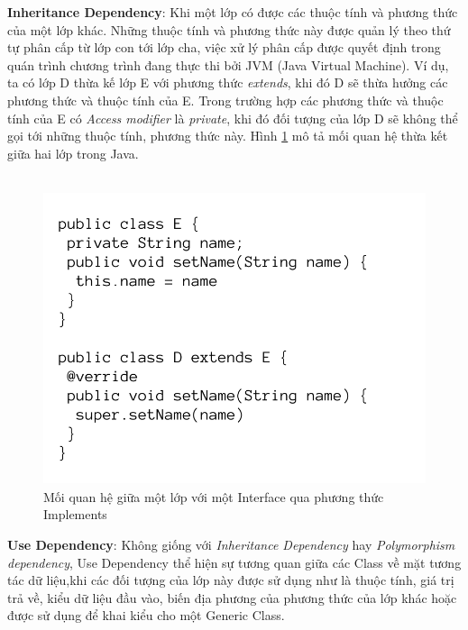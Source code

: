 \documentclass[12pt]{report}
\begin{document}
\newpage
\noindent \textbf{Inheritance Dependency}: Khi một lớp có được các thuộc tính và phương thức của một lớp khác. Những thuộc tính và phương thức này được quản lý theo thứ tự phân cấp từ lớp con tới lớp cha, việc xử lý phân cấp được quyết định trong quán trình chương trình đang thực thi bởi JVM (Java Virtual Machine). Ví dụ, ta có lớp D thừa kế lớp E với phương thức \textit{extends}, khi đó D sẽ thừa hưởng các phương thức và thuộc tính của E. Trong trường hợp các phương thức và thuộc tính của E có \textit{Access modifier} là \textit{private}, khi đó đối tượng của lớp D sẽ không thể gọi tới những thuộc tính, phương thức này. Hình \ref{fig:D_extends_E} mô tả mối quan hệ thừa kết giữa hai lớp trong Java.\\\\
\begin{figure}[!htbp]
	\centering
	\vspace{-1.5cm}
	\includegraphics[scale=0.35]{images/D_extends_E}
	\caption{Mối quan hệ giữa một lớp với một Interface qua phương thức Implements}
	\label{fig:D_extends_E}
\end{figure}

\noindent \textbf{Use Dependency}: Không giống với \textit{Inheritance Dependency} hay \textit{Polymorphism dependency}, Use Dependency thể hiện sự tương quan giữa các Class về mặt tương tác dữ liệu,khi các đối tượng của lớp này được sử dụng như là thuộc tính, giá trị trả về, kiểu dữ liệu đầu vào, biến địa phương của phương thức của lớp khác hoặc được sử dụng để khai kiểu cho một Generic Class.
\end{document}
